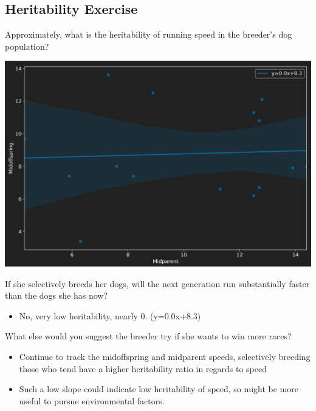 \documentclass[12pt,a4paper]{article}
\begin{document}
\subsection{Heritability Exercise}
\begin{enumerate}
    {\color{G-Moon}\item Approximately, what is the heritability of running speed in the breeder’s dog population?}
\begin{center}
    \includegraphics[scale=0.35]{images/heritability.png}
\end{center}
    {\color{G-Moon}\item If she selectively breeds her dogs, will the next generation run substantially faster than the dogs she has now?}
        \begin{itemize}
            \item No, very low heritability, nearly 0. (y=0.0x+8.3)
        \end{itemize}
    {\color{G-Moon}\item What else would you suggest the breeder try if she wants to win more races?}
        \begin{itemize}
            \item Continue to track the midoffspring and midparent speeds, selectively breeding those who tend have a higher heritability ratio in regards to speed
            \item Such a low slope could indicate low heritability of speed, so might be more useful to pursue environmental factors.
        \end{itemize}
\end{enumerate}
\end{document}
